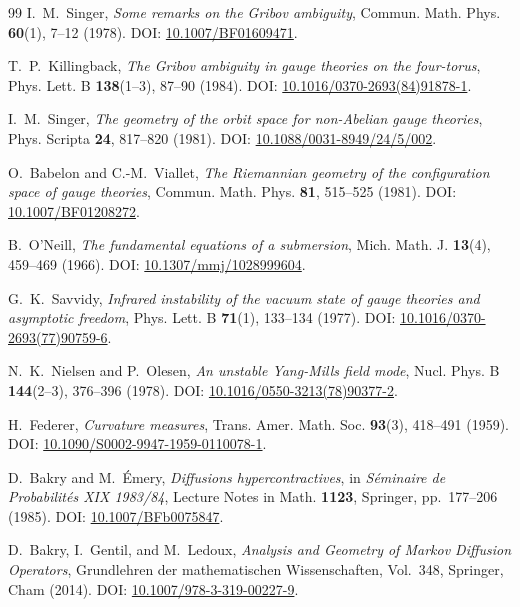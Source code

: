 \documentclass[11pt,a4paper]{amsart}
\theoremstyle{definition}
\begin{document}
\begin{thebibliography}{99}
I.~M.~Singer, \emph{Some remarks on the Gribov ambiguity}, Commun. Math. Phys. \textbf{60}(1), 7--12 (1978). DOI: \href{https://doi.org/10.1007/BF01609471}{10.1007/BF01609471}.

T.~P.~Killingback, \emph{The Gribov ambiguity in gauge theories on the four-torus}, Phys. Lett. B \textbf{138}(1--3), 87--90 (1984). DOI: \href{https://doi.org/10.1016/0370-2693(84)91878-1}{10.1016/0370-2693(84)91878-1}.

I.~M.~Singer, \emph{The geometry of the orbit space for non-Abelian gauge theories}, Phys. Scripta \textbf{24}, 817--820 (1981). DOI: \href{https://doi.org/10.1088/0031-8949/24/5/002}{10.1088/0031-8949/24/5/002}.

O.~Babelon and C.-M.~Viallet, \emph{The Riemannian geometry of the configuration space of gauge theories}, Commun. Math. Phys. \textbf{81}, 515--525 (1981). DOI: \href{https://doi.org/10.1007/BF01208272}{10.1007/BF01208272}.

B.~O'Neill, \emph{The fundamental equations of a submersion}, Mich. Math. J. \textbf{13}(4), 459--469 (1966). DOI: \href{https://doi.org/10.1307/mmj/1028999604}{10.1307/mmj/1028999604}.

G.~K.~Savvidy, \emph{Infrared instability of the vacuum state of gauge theories and asymptotic freedom}, Phys. Lett. B \textbf{71}(1), 133--134 (1977). DOI: \href{https://doi.org/10.1016/0370-2693(77)90759-6}{10.1016/0370-2693(77)90759-6}.

N.~K.~Nielsen and P.~Olesen, \emph{An unstable Yang-Mills field mode}, Nucl. Phys. B \textbf{144}(2--3), 376--396 (1978). DOI: \href{https://doi.org/10.1016/0550-3213(78)90377-2}{10.1016/0550-3213(78)90377-2}.

H.~Federer, \emph{Curvature measures}, Trans. Amer. Math. Soc. \textbf{93}(3), 418--491 (1959). DOI: \href{https://doi.org/10.1090/S0002-9947-1959-0110078-1}{10.1090/S0002-9947-1959-0110078-1}.

D.~Bakry and M.~\'Emery, \emph{Diffusions hypercontractives}, in \emph{S\'eminaire de Probabilit\'es XIX 1983/84}, Lecture Notes in Math. \textbf{1123}, Springer, pp.~177--206 (1985). DOI: \href{https://doi.org/10.1007/BFb0075847}{10.1007/BFb0075847}.

D.~Bakry, I.~Gentil, and M.~Ledoux, \emph{Analysis and Geometry of Markov Diffusion Operators}, Grundlehren der mathematischen Wissenschaften, Vol.~348, Springer, Cham (2014). DOI: \href{https://doi.org/10.1007/978-3-319-00227-9}{10.1007/978-3-319-00227-9}.


\end{thebibliography}
\end{document}
